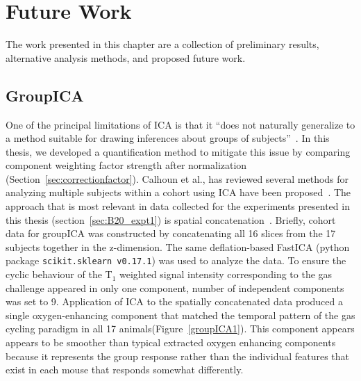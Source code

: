
\chapter{Future Work}
\label{ch:futurework}

The work presented in this chapter are a collection of preliminary results, alternative analysis methods, and proposed future work. 

\section{GroupICA}

One of the principal limitations of \acs{ICA} is that it ``does not naturally generalize to a method suitable for drawing inferences about groups of subjects''~\cite{Calhoun:2009jr}.
In this thesis, we developed a quantification method to mitigate this issue by comparing component weighting factor strength after normalization (Section~\ref{sec:correctionfactor}).
Calhoun et al., has reviewed several methods for analyzing multiple subjects within a cohort using \acs{ICA} have been proposed~\cite{Calhoun:2009jr}.
The approach that is most relevant in data collected for the experiments presented in this thesis (section~\ref{sec:B20_expt1}) is spatial concatenation~\cite{Calhoun:2001jx}.
Briefly, cohort data for groupICA was constructed by concatenating all 16 slices from the 17 subjects together in the z-dimension.
The same deflation-based \acs{FastICA} (python package \texttt{scikit.sklearn v0.17.1}) was used to analyze the data.
To ensure the cyclic behaviour of the T$_1$ weighted signal intensity corresponding to the gas challenge appeared in only one component, number of independent components was set to 9.
Application of \acs{ICA} to the spatially concatenated data produced a single oxygen-enhancing component that matched the temporal pattern of the gas cycling paradigm in all 17 animals(Figure~\ref{groupICA1}). 
This component appears appears to be smoother than typical extracted oxygen enhancing components because it represents the group response rather than the individual features that exist in each mouse that responds somewhat differently.

